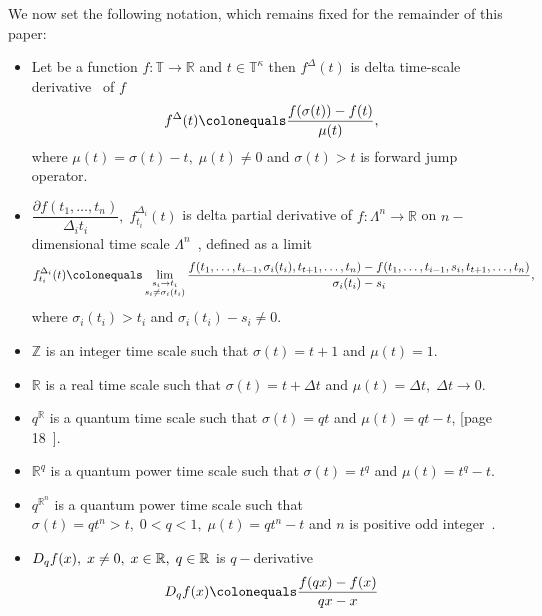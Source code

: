 We now set the following notation, which remains fixed for the remainder of this paper:
\begin{itemize}
    \item Let be a function $f\colon \mathbb{T} \to \mathbb{R}$ and $t\in\mathbb{T}^{\kappa}$ then $f^{\Delta}(t)$
    is delta time-scale derivative~\cite{Bohner2001DynamicEO} of $f$
    \[
        f^{\Delta} (t) \colonequals \frac{f(\sigma(t)) - f(t)}{\mu(t)},
    \]
    where $\mu(t) = \sigma(t) - t, \; \mu(t) \neq 0$ and $\sigma(t) > t$ is forward jump operator.

    \item $\dfrac{\partial f(t_1,\ldots,t_n)}{\Delta_i t_i}, \; f^{\Delta_i}_{t_i}(t)$ is delta partial derivative
    of $f\colon \Lambda^n \to \mathbb{R}$ on $n-$dimensional time scale
    $\Lambda^n$~\cite{bohner2004partial, ahlbrandt2002partial,JACKSON2006391},
    defined as a limit
    \[
        f^{\Delta_i}_{t_i}(t) \colonequals \lim \limits_{\substack{s_i \to t_i \\ s_i \neq \sigma_i(t_i)}}
        \frac{
            f(t_1, \ldots, t_{i-1}, \sigma_i(t_i), t_{t+1}, \ldots, t_n)
            - f(t_1, \ldots, t_{i-1}, s_i, t_{t+1}, \ldots, t_n)
        }{\sigma_i(t_i) - s_i},
    \]
    where $\sigma_i(t_i) > t_i$ and $\sigma_i(t_i) - s_i \neq 0$.

    \item $\mathbb{Z}$ is an integer time scale such that $\sigma(t) = t+1$ and $\mu(t) = 1$.

    \item $\mathbb{R}$ is a real time scale such that $\sigma(t) = t+\Delta t$ and $\mu(t) = \Delta t, \; \Delta t \to 0$.

    \item $q^\mathbb{R}$ is a quantum time scale such that $\sigma(t) = qt$ and $\mu(t) = qt - t$,
    [page 18~\cite{Bohner2001DynamicEO}].

    \item $\mathbb{R}^q$ is a quantum power time scale such that $\sigma(t) = t^q$ and $\mu(t) = t^q - t$.

    \item $q^{\mathbb{R}^n}$ is a quantum power time scale
    such that $\sigma(t) = qt^n > t, \; 0<q<1, \; \mu(t) = qt^n - t$ and $n$ is positive
    odd integer~\cite{aldwoah2011power}.

    \item $D_{q} f(x), \; x\neq 0, \; x\in\mathbb{R}, \; q\in\mathbb{R}$ is $q-$derivative~\cite{jackson_1909,ernst2000history,ernst2008different,kac2001quantum}
    \[
        \qderivative{f(x)} \colonequals \frac{f(qx)-f(x)}{qx-x}
    \]


\end{itemize}
